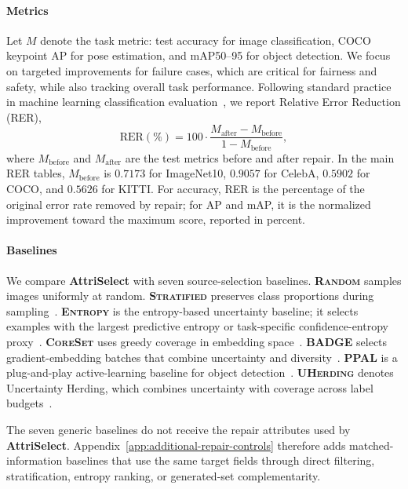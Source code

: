 \documentclass{article}
\newcommand{\modelname}{AttriSelect}
\newcommand{\model}{\textcolor{darkteal}{\textbf{\modelname}}\xspace}
\begin{document}
\paragraph{Metrics}
Let $M$ denote the task metric: test accuracy for image classification, COCO keypoint AP for pose estimation, and mAP50--95 for object detection. We focus on targeted improvements for failure cases, which are critical for fairness and safety, while also tracking overall task performance. Following standard practice in machine learning classification evaluation~\citep{manning1999foundations}, we report Relative Error Reduction (RER),
\begin{equation}
\mathrm{RER}(\%)=100\cdot\frac{M_{\mathrm{after}}-M_{\mathrm{before}}}{1-M_{\mathrm{before}}},
\end{equation}
where $M_{\mathrm{before}}$ and $M_{\mathrm{after}}$ are the test metrics before and after repair. In the main RER tables, $M_{\mathrm{before}}$ is $0.7173$ for ImageNet10, $0.9057$ for CelebA, $0.5902$ for COCO, and $0.5626$ for KITTI. For accuracy, RER is the percentage of the original error rate removed by repair; for AP and mAP, it is the normalized improvement toward the maximum score, reported in percent.

\paragraph{Baselines}
We compare \model with seven source-selection baselines. \textbf{\textsc{Random}} samples images uniformly at random. \textbf{\textsc{Stratified}} preserves class proportions during sampling~\citep{neyman1934two}. \textbf{\textsc{Entropy}} is the entropy-based uncertainty baseline; it selects examples with the largest predictive entropy or task-specific confidence-entropy proxy~\citep{settles2009active}. \textbf{\textsc{CoreSet}} uses greedy coverage in embedding space~\citep{sener2018active}. \textbf{\textsc{BADGE}} selects gradient-embedding batches that combine uncertainty and diversity~\citep{ash2020deep}. \textbf{\textsc{PPAL}} is a plug-and-play active-learning baseline for object detection~\citep{yang2024ppal}. \textbf{\textsc{UHerding}} denotes Uncertainty Herding, which combines uncertainty with coverage across label budgets~\citep{bae2025uncertainty}.

The seven generic baselines do not receive the repair attributes used by \model. Appendix~\ref{app:additional-repair-controls} therefore adds matched-information baselines that use the same target fields through direct filtering, stratification, entropy ranking, or generated-set complementarity.
\end{document}
